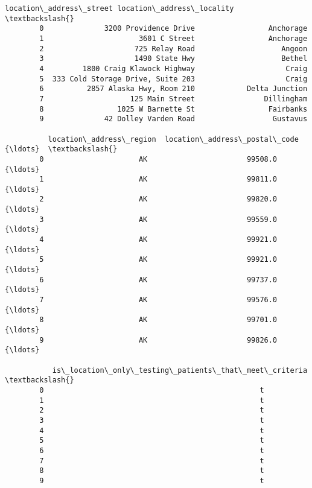 \documentclass[11pt]{article}
\begin{document}
\begin{Verbatim}[commandchars=\\\{\}]
                     location\_address\_street location\_address\_locality  \textbackslash{}
        0              3200 Providence Drive                 Anchorage   
        1                      3601 C Street                 Anchorage   
        2                     725 Relay Road                    Angoon   
        3                     1490 State Hwy                    Bethel   
        4         1800 Craig Klawock Highway                     Craig   
        5  333 Cold Storage Drive, Suite 203                     Craig   
        6          2857 Alaska Hwy, Room 210            Delta Junction   
        7                    125 Main Street                Dillingham   
        8                 1025 W Barnette St                 Fairbanks   
        9              42 Dolley Varden Road                  Gustavus   
        
          location\_address\_region  location\_address\_postal\_code  {\ldots}  \textbackslash{}
        0                      AK                       99508.0  {\ldots}   
        1                      AK                       99811.0  {\ldots}   
        2                      AK                       99820.0  {\ldots}   
        3                      AK                       99559.0  {\ldots}   
        4                      AK                       99921.0  {\ldots}   
        5                      AK                       99921.0  {\ldots}   
        6                      AK                       99737.0  {\ldots}   
        7                      AK                       99576.0  {\ldots}   
        8                      AK                       99701.0  {\ldots}   
        9                      AK                       99826.0  {\ldots}   
        
           is\_location\_only\_testing\_patients\_that\_meet\_criteria  \textbackslash{}
        0                                                  t      
        1                                                  t      
        2                                                  t      
        3                                                  t      
        4                                                  t      
        5                                                  t      
        6                                                  t      
        7                                                  t      
        8                                                  t      
        9                                                  t      
        

\end{Verbatim}
\end{document}
